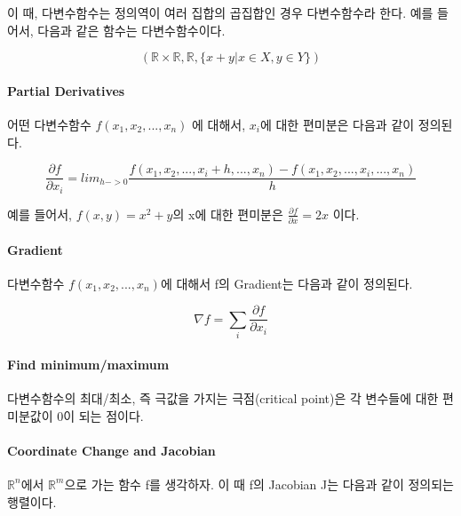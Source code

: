 이 때, 다변수함수는 정의역이 여러 집합의 곱집합인 경우 다변수함수라 한다. 예를 들어서, 다음과 같은 함수는 다변수함수이다. 

\begin{example} 
\begin{equation}
(\mathds{R} \times \mathds{R}, \mathds{R}, \{x+y| x \in X, y \in Y \})
\end{equation}
\end{example}


\paragraph{Partial Derivatives} 어떤 다변수함수 $f(x_1, x_2, ... , x_n)$ 에 대해서, $x_i$에 대한 편미분은 다음과 같이 정의된다. 

\begin{definition} 
\begin{equation}
\frac{\partial f}{\partial x_i} = lim_{h->0} \frac{f(x_1, x_2, ..., x_i+h, ... , x_n) - f(x_1, x_2, ..., x_i, ... , x_n) }{h}
\end{equation}
\end{definition}

예를 들어서, $f(x,y) = x^2+y$의 x에 대한 편미분은 $\frac{\partial f}{\partial x} = 2x$ 이다. 

 
\paragraph{Gradient} 
다변수함수 $f(x_1, x_2, ... , x_n)$에 대해서 f의 Gradient는 다음과 같이 정의된다. 
\begin{definition} 
\begin{equation} 
\nabla f =  \sum_i \frac{\partial f}{\partial x_i}
\end{equation}
\end{definition}

\paragraph{Find minimum/maximum} 
다변수함수의 최대/최소, 즉 극값을 가지는 극점(critical point)은 각 변수들에 대한 편미분값이 0이 되는 점이다. 
\paragraph{Coordinate Change and Jacobian} 
$\mathds{R}^n$에서 $\mathds{R}^m$으로 가는 함수 f를 생각하자. 이 때 f의 Jacobian J는 다음과 같이 정의되는 행렬이다. 

